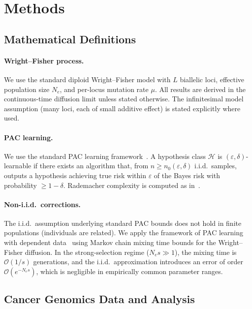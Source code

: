 \documentclass[12pt]{article}
\theoremstyle{remark}
\begin{document}
\section{Methods}

\subsection{Mathematical Definitions}

\paragraph{Wright--Fisher process.} We use the standard diploid Wright--Fisher model with $L$ biallelic loci, effective population size $N_e$, and per-locus mutation rate $\mu$. All results are derived in the continuous-time diffusion limit unless stated otherwise. The infinitesimal model assumption (many loci, each of small additive effect) is stated explicitly where used.

\paragraph{PAC learning.} We use the standard PAC learning framework~\cite{valiant1984,kearns1994}. A hypothesis class $\mathcal{H}$ is $(\varepsilon, \delta)$-learnable if there exists an algorithm that, from $n \geq n_0(\varepsilon, \delta)$ i.i.d.\ samples, outputs a hypothesis achieving true risk within $\varepsilon$ of the Bayes risk with probability $\geq 1 - \delta$. Rademacher complexity is computed as in~\cite{bartlett2002}.

\paragraph{Non-i.i.d.\ corrections.} The i.i.d.\ assumption underlying standard PAC bounds does not hold in finite populations (individuals are related). We apply the framework of PAC learning with dependent data~\cite{shalizi2009,yu1994,modha1996} using Markov chain mixing time bounds for the Wright--Fisher diffusion. In the strong-selection regime ($N_e s \gg 1$), the mixing time is $\mathcal{O}(1/s)$ generations, and the i.i.d.\ approximation introduces an error of order $\mathcal{O}(e^{-N_e s})$, which is negligible in empirically common parameter ranges.

\subsection{Cancer Genomics Data and Analysis}
\end{document}
